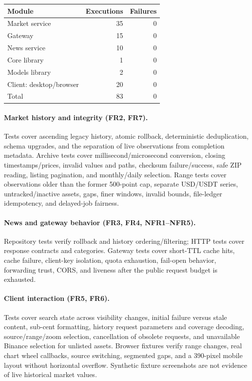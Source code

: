 \documentclass{scrartcl}
\begin{document}
\begin{center}
\begin{tabular}{lrr}
\toprule
Module & Executions & Failures \\
\midrule
Market service & 35 & 0 \\
Gateway & 15 & 0 \\
News service & 10 & 0 \\
Core library & 1 & 0 \\
Models library & 2 & 0 \\
Client: desktop/browser & 20 & 0 \\
\midrule
Total & 83 & 0 \\
\bottomrule
\end{tabular}
\end{center}

\paragraph{Market history and integrity (FR2, FR7).} Tests cover ascending legacy history,
atomic rollback, deterministic deduplication, schema upgrades, and the separation of live
observations from completion metadata. Archive tests cover millisecond/microsecond conversion,
closing timestamps/prices, invalid values and paths, checksum failure/success, safe ZIP reading,
listing pagination, and monthly/daily selection. Range tests cover observations older than the
former 500-point cap, separate USD/USDT series, untracked/inactive assets, gaps, finer windows,
invalid bounds, file-ledger idempotency, and delayed-job fairness.

\paragraph{News and gateway behavior (FR3, FR4, NFR1--NFR5).} Repository tests verify rollback
and history ordering/filtering; HTTP tests cover response contracts and categories. Gateway tests
cover short-TTL cache hits, cache failure, client-key isolation, quota exhaustion, fail-open
behavior, forwarding trust, CORS, and liveness after the public request budget is exhausted.

\paragraph{Client interaction (FR5, FR6).} Tests cover search state across visibility changes,
initial failure versus stale content, sub-cent formatting, history request parameters and coverage
decoding, source/range/zoom selection, cancellation of obsolete requests, and unavailable Binance
selection for unlisted assets. Browser fixtures verify range changes, real chart wheel callbacks,
source switching, segmented gaps, and a 390-pixel mobile layout without horizontal overflow.
Synthetic fixture screenshots are not evidence of live historical market values.
\end{document}
